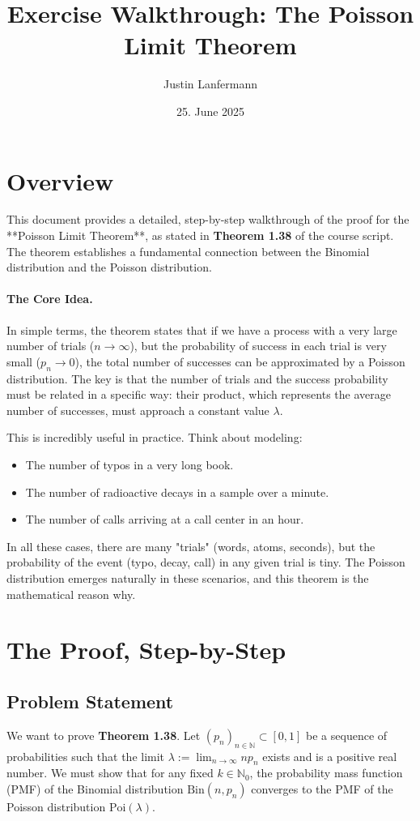 \documentclass[11pt,a4paper]{article}
\title{Exercise Walkthrough: The Poisson Limit Theorem}
\author{Justin Lanfermann}
\date{25. June 2025}
\begin{document}
\maketitle

\section{Overview}
This document provides a detailed, step-by-step walkthrough of the proof for the **Poisson Limit Theorem**, as stated in \textbf{Theorem 1.38} of the course script. The theorem establishes a fundamental connection between the Binomial distribution and the Poisson distribution.

\paragraph{The Core Idea.} In simple terms, the theorem states that if we have a process with a very large number of trials ($n \to \infty$), but the probability of success in each trial is very small ($p_n \to 0$), the total number of successes can be approximated by a Poisson distribution. The key is that the number of trials and the success probability must be related in a specific way: their product, which represents the average number of successes, must approach a constant value $\lambda$.

This is incredibly useful in practice. Think about modeling:
\begin{itemize}
    \item The number of typos in a very long book.
    \item The number of radioactive decays in a sample over a minute.
    \item The number of calls arriving at a call center in an hour.
\end{itemize}
In all these cases, there are many "trials" (words, atoms, seconds), but the probability of the event (typo, decay, call) in any given trial is tiny. The Poisson distribution emerges naturally in these scenarios, and this theorem is the mathematical reason why.

\section{The Proof, Step-by-Step}

\subsection{Problem Statement}
We want to prove \textbf{Theorem 1.38}. Let $(p_n)_{n \in \mathbb{N}} \subset [0,1]$ be a sequence of probabilities such that the limit $\lambda := \lim_{n \to \infty} n p_n$ exists and is a positive real number. We must show that for any fixed $k \in \mathbb{N}_0$, the probability mass function (PMF) of the Binomial distribution $\text{Bin}(n, p_n)$ converges to the PMF of the Poisson distribution $\text{Poi}(\lambda)$.
\end{document}
